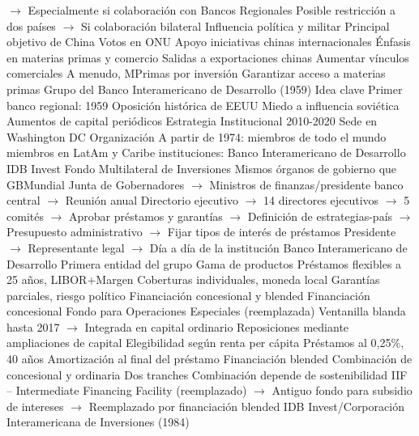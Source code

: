 \documentclass{nuevotema}
\begin{document}
\begin{esquemal}
				\4[] $\to$ Especialmente si colaboración con Bancos Regionales
				\4[] Posible restricción a dos países
				\4[] $\to$ Si colaboración bilateral
			\3 Influencia política y militar
				\4 Principal objetivo de China
				\4 Votos en ONU
				\4 Apoyo iniciativas chinas internacionales
			\3 Énfasis en materias primas y comercio
				\4 Salidas a exportaciones chinas
				\4 Aumentar vínculos comerciales
				\4 A menudo, MPrimas por inversión
				\4[] Garantizar acceso a materias primas
	\1 
		\2 Grupo del Banco Interamericano de Desarrollo (1959)
			\3 Idea clave
				\4 Primer banco regional: 1959
				\4 Oposición histórica de EEUU
				\4 Miedo a influencia soviética
				\4 Aumentos de capital periódicos
				\4 Estrategia Institucional 2010-2020
				\4 Sede en Washington DC
			\3 Organización
				\4 A partir de 1974: miembros de todo el mundo
				 miembros
				 en LatAm y Caribe
				 instituciones:
				\4[] Banco Interamericano de Desarrollo
				\4[] IDB Invest
				\4[] Fondo Multilateral de Inversiones
				\4 Mismos órganos de gobierno que GBMundial
				\4[] Junta de Gobernadores
				\4[] $\to$ Ministros de finanzas/presidente banco central
				\4[] $\to$ Reunión anual
				\4[] Directorio ejecutivo
				\4[] $\to$ 14 directores ejecutivos
				\4[] $\to$ 5 comités
				\4[] $\to$ Aprobar préstamos y garantías
				\4[] $\to$ Definición de estrategias-país
				\4[] $\to$ Presupuesto administrativo
				\4[] $\to$ Fijar tipos de interés de préstamos
				\4[] Presidente
				\4[] $\to$ Representante legal
				\4[] $\to$ Día a día de la institución
			\3 Banco Interamericano de Desarrollo
				\4 Primera entidad del grupo
				\4 Gama de productos
				\4[] Préstamos flexibles a 25 años, LIBOR+Margen
				\4[] Coberturas individuales, moneda local
				\4[] Garantías parciales, riesgo político
				\4[] Financiación concesional y blended
				\4 Financiación concesional
				\4[] Fondo para Operaciones Especiales (reemplazada)
				\4[] Ventanilla blanda hasta 2017
				\4[] $\to$ Integrada en capital ordinario
				\4[] Reposiciones mediante ampliaciones de capital
				\4[] Elegibilidad según renta per cápita
				\4[] Préstamos al 0,25\%, 40 años
				\4[] Amortización al final del préstamo
				\4 Financiación blended
				\4[] Combinación de concesional y ordinaria
				\4[] Dos tranches
				\4[] Combinación depende de sostenibilidad
				\4[] IIF -- Intermediate Financing Facility (reemplazado)
				\4[] $\to$ Antiguo fondo para subsidio de intereses
				\4[] $\to$ Reemplazado por financiación blended
			\3 IDB Invest/Corporación Interamericana de Inversiones (1984)

\end{esquemal}
\end{document}
